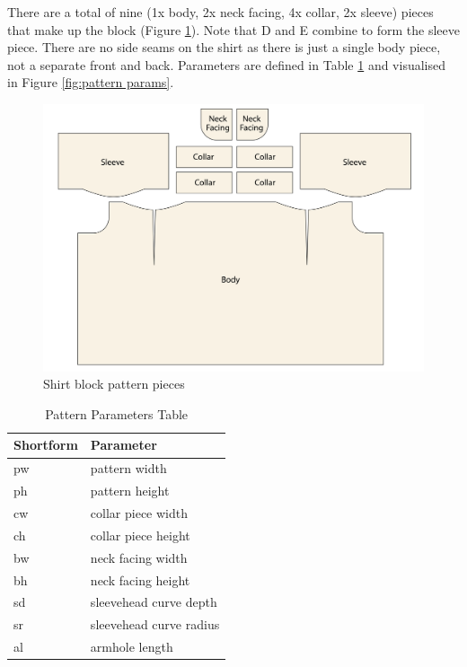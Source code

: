 There are a total of nine (1x body, 2x neck facing, 4x collar, 2x sleeve) pieces that make up the block (Figure \ref{fig:original pattern pieces}). Note that D and E combine to form the sleeve piece. There are no side seams on the shirt as there is just a single body piece, not a separate front and back. Parameters are defined in Table \ref{tab:pattern_params} and visualised in Figure \ref{fig:pattern params}.
\newpage
\begin{figure} [H] 
    \centering 
    \includegraphics[width = \textwidth]{Images/originalpattern_pieces.png} 
    \caption{Shirt block pattern pieces}
    \label{fig:original pattern pieces}
\end{figure}
\begin{table}[H]
    \centering
    \captionsetup{font=small}
    \begin{tabular}{
        >{\centering\arraybackslash}p{2cm} | 
        >{\arraybackslash}p{5cm}
    }
        \toprule
        \textbf{Shortform} & \textbf{Parameter} \\
        \midrule
        pw & pattern width \\
        ph & pattern height \\
        cw & collar piece width \\
        ch & collar piece height \\
        bw & neck facing width \\
        bh & neck facing height \\
        sd & sleevehead curve depth \\
        sr & sleevehead curve radius \\
        al & armhole length \\
        \bottomrule
    \end{tabular}
    \caption{Pattern Parameters Table}
    \label{tab:pattern_params}
\end{table}
